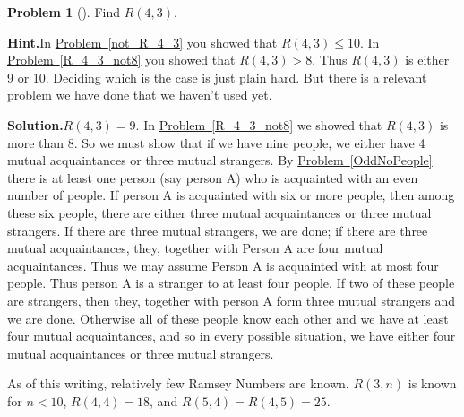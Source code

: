 \documentclass[10pt,]{book}
\theoremstyle{plain}
\theoremstyle{definition}
\newtheorem{activity}[project]{Problem}
\theoremstyle{definition}
\numberwithin{equation}{chapter}
\newcommand{\lt}{<}
\newcommand{\gt}{>}
\begin{document}
\begin{activity}[]\label{activity-71}
Find \(R(4,3)\).%
\par\medskip\noindent%
\textbf{Hint.}\quad In \hyperref[not_R_4_3]{Problem~\ref{not_R_4_3}} you showed that \(R(4, 3) \le 10\). In \hyperref[R_4_3_not8]{Problem~\ref{R_4_3_not8}} you showed that \(R(4, 3) \gt 8\). Thus \(R(4, 3)\) is either 9 or 10. Deciding which is the case is just plain hard. But there is a relevant problem we have done that we haven't used yet.%
\par\medskip\noindent%
\textbf{Solution.}\quad \(R(4,3)=9\). In \hyperref[R_4_3_not8]{Problem~\ref{R_4_3_not8}} we showed that \(R(4,3)\) is more than 8. So we must show that if we have nine people, we either have 4 mutual acquaintances or three mutual strangers. By \hyperref[OddNoPeople]{Problem~\ref{OddNoPeople}} there is at least one person (say person A) who is acquainted with an even number of people. If person A is acquainted with six or more people, then among these six people, there are either three mutual acquaintances or three mutual strangers. If there are three mutual strangers, we are done; if there are three mutual acquaintances, they, together with Person A are four mutual acquaintances. Thus we may assume Person A is acquainted with at most four people. Thus person A is a stranger to at least four people. If two of these people are strangers, then they, together with person A form three mutual strangers and we are done. Otherwise all of these people know each other and we have at least four mutual acquaintances, and so in every possible situation, we have either four mutual acquaintances or three mutual strangers.%
\end{activity}
As of this writing, relatively few Ramsey Numbers are known. \(R(3,n)\) is known for \(n\lt 10\), \(R(4,4) = 18\), and \(R(5,4)=R(4,5)=25\).%
\typeout{************************************************}
\typeout{************************************************}
\end{document}
